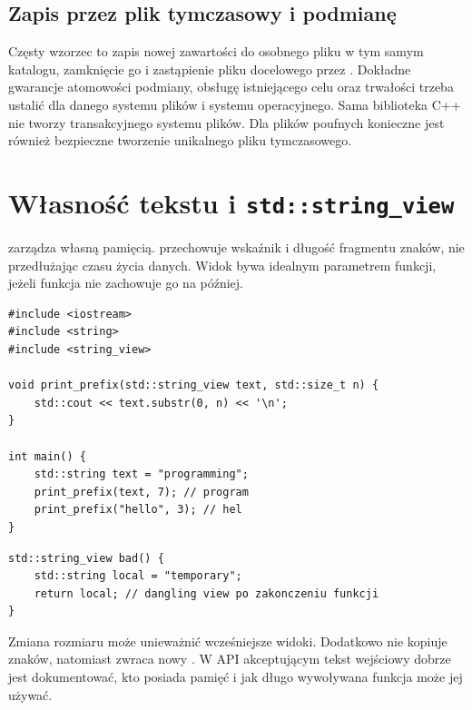 \subsection{Zapis przez plik tymczasowy i podmianę}

Częsty wzorzec to zapis nowej zawartości do osobnego pliku w tym
samym katalogu, zamknięcie go i zastąpienie pliku docelowego przez
. Dokładne gwarancje atomowości podmiany, obsługę
istniejącego celu oraz trwałości trzeba ustalić dla danego systemu
plików i systemu operacyjnego. Sama biblioteka C++ nie tworzy
transakcyjnego systemu plików. Dla plików poufnych konieczne jest
również bezpieczne tworzenie unikalnego pliku tymczasowego.

\section{Własność tekstu i \texttt{std::string\_view}}
\label{sec:cpp19-text}

 zarządza własną pamięcią. 
przechowuje wskaźnik i długość fragmentu znaków, nie przedłużając
czasu życia danych. Widok bywa idealnym parametrem funkcji, jeżeli
funkcja nie zachowuje go na później.

\begin{lstlisting}[caption={Widok do bufora -- bez kopiowania (kompletny program).}]
#include <iostream>
#include <string>
#include <string_view>

void print_prefix(std::string_view text, std::size_t n) {
    std::cout << text.substr(0, n) << '\n';
}

int main() {
    std::string text = "programming";
    print_prefix(text, 7); // program
    print_prefix("hello", 3); // hel
}
\end{lstlisting}

\begin{lstlisting}[caption={Blad czasu zycia -- tylko ilustracja, nie uruchamiac.}]
std::string_view bad() {
    std::string local = "temporary";
    return local; // dangling view po zakonczeniu funkcji
}
\end{lstlisting}

Zmiana rozmiaru  może unieważnić wcześniejsze widoki.
Dodatkowo  nie kopiuje znaków, natomiast
 zwraca nowy . W API akceptującym
tekst wejściowy dobrze jest dokumentować, kto posiada pamięć i jak
długo wywoływana funkcja może jej używać.

